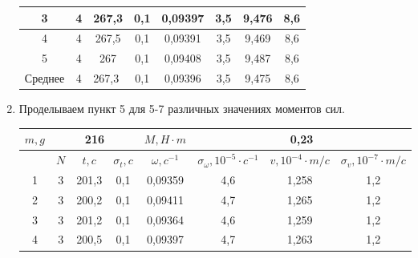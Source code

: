 \documentclass[a4paper, 12pt]{article}%
\begin{document}
\begin{enumerate}
\begin{center}
\begin{tabular}{|c|c|c|c|c|c|c|c|}
3                            & 4   & 267,3                       & 0,1           & 0,09397          & 3,5                                     & 9,476                  & 8,6                           \\ \hline
4                            & 4   & 267,5                       & 0,1           & 0,09391          & 3,5                                     & 9,469                  & 8,6                           \\ \hline
5                            & 4   & 267                         & 0,1           & 0,09408          & 3,5                                     & 9,487                  & 8,6                           \\ \hline
Среднее                      & 4   & \multicolumn{1}{l|}{267,3} & 0,1           & 0,09396          & 3,5                                     & 9,475                  & 8,6                           \\ \hline
\end{tabular}
\end{center}
\item Проделываем пункт 5 для 5-7 различных значениях моментов сил.
\begin{center}
\begin{tabular}{|c|c|c|c|c|c|c|c|}
\hline
\multicolumn{1}{|c|}{$m, g$} & \multicolumn{3}{c|}{216}                          & $M, H \cdot m$   & \multicolumn{3}{c|}{0,23}                                                                        \\ \hline
                             & $N$ & $t, c$                      & $\sigma_t, c$ & $\omega, c^{-1}$ & $\sigma_{\omega}, 10^{-5} \cdot c^{-1}$ & $v, 10^{-4} \cdot m/c$ & $\sigma_v, 10^{-7} \cdot m/c$ \\ \hline
1                            & 3   & 201,3                       & 0,1           & 0,09359      & 4,6                                     & 1,258                  & 1,2                           \\ \hline
2                            & 3   & 200,2                       & 0,1           & 0,09411     & 4,7                                     & 1,265                  & 1,2                           \\ \hline
3                            & 3   & 201,2                       & 0,1           & 0,09364    & 4,6                                     & 1,259                  & 1,2                           \\ \hline
4                            & 3   & 200,5                       & 0,1           & 0,09397     & 4,7                                     & 1,263                  & 1,2                           \\ \hline

\end{tabular}
\end{center}
\end{enumerate}
\end{document}
